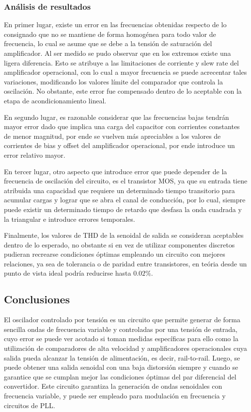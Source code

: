 \subsubsection{An\'alisis de resultados}
En primer lugar, existe un error en las frecuencias obtenidas respecto de lo consignado que no se mantiene de forma homog\'enea para todo valor de frecuencia,
lo cual se asume que se debe a la tensi\'on de saturaci\'on del amplificador. Al ser medido se pudo observar que en los extremos existe una ligera diferencia.
Esto se atribuye a las limitaciones de corriente y slew rate del amplificador operacional, con lo cual a mayor frecuencia se puede acrecentar tales variaciones,
modificando los valores l\'imite del comparador que controla la oscilaci\'on. No obstante, este error fue compensado dentro de lo aceptable con la etapa de acondicionamiento lineal.

En segundo lugar, es razonable considerar que las frecuencias bajas tendr\'an mayor error dado que implica una carga del capacitor con corrientes constantes de menor magnitud,
por ende se vuelven m\'as apreciables a los valores de corrientes de bias y offset del amplificador operacional, por ende introduce un error relativo mayor.

En tercer lugar, otro aspecto que introduce error que puede depender de la frecuencia de oscilaci\'on del circuito, es el transistor MOS, ya que su entrada tiene atribuida una capacidad
que requiere un determinado tiempo transitorio para acumular cargas y lograr que se abra el canal de conducci\'on, por lo cual, siempre puede existir un determinado tiempo de retardo que desfasa
la onda cuadrada y la triangular e introduce errores temporales.

Finalmente, los valores de THD de la senoidal de salida se consideran aceptables dentro de lo esperado, no obstante si en vez de utilizar componentes discretos pudieran recrearse condiciones \'optimas
empleando un circuito con mejores relaciones, ya sea de tolerancia o de paridad entre transistores, en te\'oria desde un punto de vista ideal podr\'ia reducirse hasta $0.02\%$.

\subsection{Conclusiones}
El oscilador controlado por tensi\'on es un circuito que permite generar de forma sencilla ondas de frecuencia variable y controladas por una tensi\'on de entrada, cuyo error se puede ver acotado si toman
medidas espec\'ificas para ello como la utilizaci\'on de comparadores de alta velocidad y amplificadores operacionales cuya salida pueda alcanzar la tensi\'on de alimentaci\'on, es decir, rail-to-rail. Luego,
se puede obtener una salida senoidal con una baja distorsi\'on siempre y cuando se garantice que se cumplan mejor las condiciones \'optimas del par diferencial del convertidor. Este circuito garantiza
la generaci\'on de ondas senoidales con frecuencia variable, y puede ser empleado para modulaci\'on en frecuencia y circuitos de PLL.